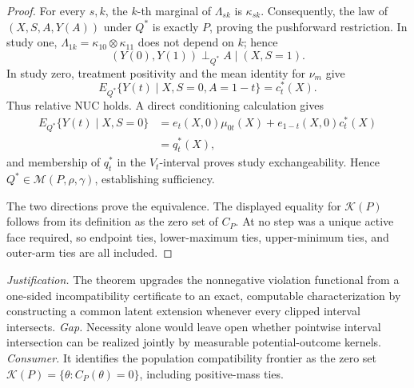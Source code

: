 \documentclass{article}
\begin{document}
\begin{proof}
For every \(s,k\), the \(k\)-th marginal of \(\Lambda_{sk}\) is \(\kappa_{sk}\). Consequently, the law of \((X,S,A,Y(A))\) under \(Q^*\) is exactly \(P\), proving the pushforward restriction. In study one, \(\Lambda_{1k}=\kappa_{10}\otimes\kappa_{11}\) does not depend on \(k\); hence\[(Y(0),Y(1))\perp_{Q^*}A\mid(X,S=1).\]In study zero, treatment positivity and the mean identity for \(\nu_m\) give\[E_{Q^*}\{Y(t)\mid X,S=0,A=1-t\}=c_t^*(X).\]Thus relative NUC holds. A direct conditioning calculation gives\[\begin{aligned}E_{Q^*}\{Y(t)\mid X,S=0\}&=e_t(X,0)\mu_{0t}(X)+e_{1-t}(X,0)c_t^*(X)\\&=q_t^*(X),\end{aligned}\]and membership of \(q_t^*\) in the \(V_t\)-interval proves study exchangeability. Hence \(Q^*\in\mathcal M(P,\rho,\gamma)\), establishing sufficiency.

The two directions prove the equivalence. The displayed equality for \(\mathcal K(P)\) follows from its definition as the zero set of \(C_P\). At no step was a unique active face required, so endpoint ties, lower-maximum ties, upper-minimum ties, and outer-arm ties are all included.
\end{proof}
\par\smallskip\noindent \textit{Justification.} The theorem upgrades the nonnegative violation functional from a one-sided incompatibility certificate to an exact, computable characterization by constructing a common latent extension whenever every clipped interval intersects. \textit{Gap.} Necessity alone would leave open whether pointwise interval intersection can be realized jointly by measurable potential-outcome kernels. \textit{Consumer.} It identifies the population compatibility frontier as the zero set \(\mathcal K(P)=\{\theta:C_P(\theta)=0\}\), including positive-mass ties.
\end{document}
